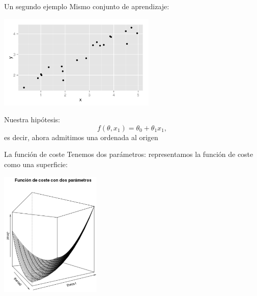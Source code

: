 \documentclass[aspectratio=169]{beamer}
\begin{document}
\begin{frame}{Un segundo ejemplo}
Mismo  conjunto de aprendizaje:
\begin{center}
  \includegraphics[height=4.5cm]{rectaorigen.png}
\end{center}
   Nuestra hipótesis: $$f(\theta,x_1)=\theta_0+\theta_1x_1,$$
es decir, ahora admitimos una ordenada al origen
\end{frame}
\begin{frame}{La función de coste}
  Tenemos dos parámetros:  representamos la función de coste como una
  superficie: 
\begin{center}
  \includegraphics[height=6cm]{superficie_funcion_coste.png}
\end{center}  
\end{frame}
\end{document}
